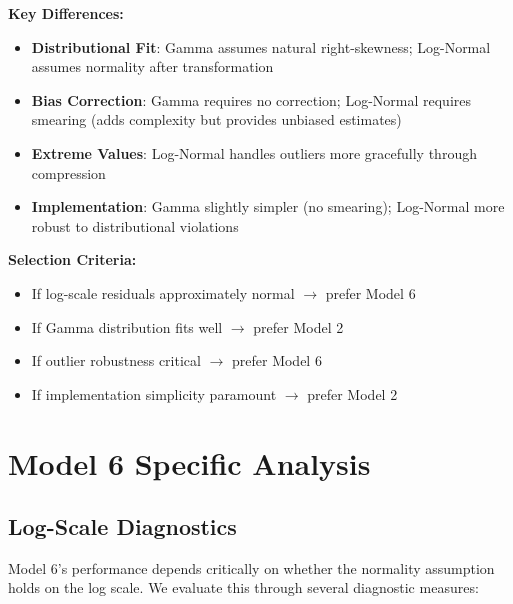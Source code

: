 \textbf{Key Differences:}

\begin{itemize}
    \item \textbf{Distributional Fit}: Gamma assumes natural right-skewness; Log-Normal assumes normality after transformation
    \item \textbf{Bias Correction}: Gamma requires no correction; Log-Normal requires smearing (adds complexity but provides unbiased estimates)
    \item \textbf{Extreme Values}: Log-Normal handles outliers more gracefully through compression
    \item \textbf{Implementation}: Gamma slightly simpler (no smearing); Log-Normal more robust to distributional violations
\end{itemize}

\textbf{Selection Criteria:}
\begin{itemize}
    \item If log-scale residuals approximately normal $\rightarrow$ prefer Model 6
    \item If Gamma distribution fits well $\rightarrow$ prefer Model 2
    \item If outlier robustness critical $\rightarrow$ prefer Model 6
    \item If implementation simplicity paramount $\rightarrow$ prefer Model 2
\end{itemize}




\section{Model 6 Specific Analysis}

\subsection{Log-Scale Diagnostics}

Model 6's performance depends critically on whether the normality assumption holds on the log scale. We evaluate this through several diagnostic measures:

